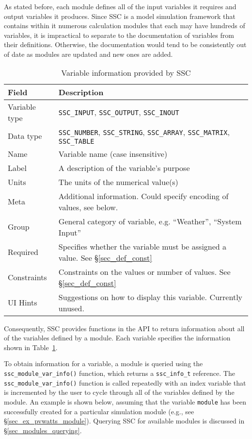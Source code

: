 \documentclass{article}
\begin{document}
As stated before, each module defines all of the input variables it requires and output variables it produces.  Since SSC is a model simulation framework that contains within it numerous calculation modules that each may have hundreds of variables, it is impractical to separate to the documentation of variables from their definitions.  Otherwise, the documentation would tend to be consistently out of date as modules are updated and new ones are added.
\begin{table}[ht]
\begin{center}
\begin{tabular}{ll}
Field & Description\\
\hline
Variable type & \texttt{SSC\_INPUT}, \texttt{SSC\_OUTPUT}, \texttt{SSC\_INOUT} \\
Data type & \texttt{SSC\_NUMBER}, \texttt{SSC\_STRING}, \texttt{SSC\_ARRAY}, \texttt{SSC\_MATRIX}, \texttt{SSC\_TABLE} \\
Name & Variable name (case insensitive) \\
Label & A description of the variable's purpose \\
Units & The units of the numerical value(s) \\
Meta & Additional information. Could specify encoding of values, see below. \\
Group & General category of variable, e.g. ``Weather'', ``System Input'' \\
Required & Specifies whether the variable must be assigned a value. See \S\ref{sec_def_const} \\
Constraints & Constraints on the values or number of values. See \S\ref{sec_def_const} \\
UI Hints & Suggestions on how to display this variable.  Currently unused. \\
\end{tabular}
\caption{Variable information provided by SSC}
\label{tab_varinfo}
\end{center}
\end{table}

Consequently, SSC provides functions in the API to return information about all of the variables defined by a module.  Each variable specifies the information shown in Table~\ref{tab_varinfo}.

To obtain information for a variable, a module is queried using the \texttt{ssc\_module\_var\_info()} function, which returns a \texttt{ssc\_info\_t} reference.  The \texttt{ssc\_module\_var\_info()} function is called repeatedly with an index variable that is incremented by the user to cycle through all of the variables defined by the module.  An example is shown below, assuming that the variable \texttt{module} has been successfully created for a particular simulation module (e.g., see \S\ref{sec_ex_pvwatts_module}).  Querying SSC for available modules is discussed in \S\ref{sec_modules_querying}.
\end{document}
